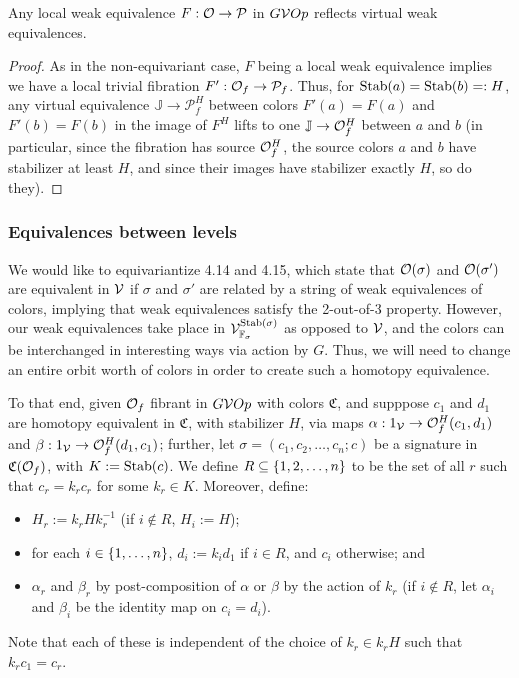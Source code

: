 \documentclass[psamsfonts,onesided,10pt,letterpaper]{amsart}%
\renewcommand{\C}{\ensuremath{\mathfrak{C}}}
\newcommand{\J}{\ensuremath{\mathbb{J}}}
\renewcommand{\P}{\ensuremath{\mathcal{P}}}
\newcommand{\Vsigma}{\ensuremath{\V^{\Stab(\sigma)}_{\F_\sigma}}}
\begin{document}
\begin{lemma}
  Any local weak equivalence $F: \O\to \P$ in $G\mathcal V Op$ reflects virtual weak equivalences.
\end{lemma}
\begin{proof}
  As in the non-equivariant case, $F$ being a local weak equivalence implies we have a local trivial fibration $F': \O_f\to \P_f$. Thus, for $\mathrm{Stab}(a) = \mathrm{Stab}(b) =: H$, any virtual equivalence $\J \to \P_f^H$ between colors $F'(a) = F(a)$ and $F'(b) = F(b)$ in the image of $F^H$ lifts to one $\J\to \O_f^H$ between $a$ and $b$ (in particular, since the fibration has source $\mathcal{O}_f^H$, the source colors $a$ and $b$ have stabilizer at least $H$, and since their images have stabilizer exactly $H$, so do they). 
\end{proof}

\subsubsection{Equivalences between levels}

We would like to equivariantize \cite{Cav14} 4.14 and 4.15, which state that $\mathcal{O}(\sigma)$ and $\mathcal{O}(\sigma')$ are equivalent in $\mathcal V$ if $\sigma$ and $\sigma'$ are related by a string of weak equivalences of colors, implying that weak equivalences satisfy the 2-out-of-3 property. However, our weak equivalences take place in $\Vsigma$ as opposed to $\mathcal V$, and the colors can be interchanged in interesting ways via action by $G$. Thus, we will need to change an entire orbit worth of colors in order to create such a homotopy equivalence. 

To that end, given $\mathcal{O}_f$ fibrant in $G\mathcal V Op$ with colors $\C$, and supppose $c_1$ and $d_1$ are homotopy equivalent in $\C$, with stabilizer $H$, via maps $\alpha: 1_{\mathcal V} \to \mathcal{O}_f^H(c_1,d_1)$ and $\beta: 1_{\mathcal V} \to \mathcal{O}_f^H(d_1,c_1)$; further, let $\sigma = (c_1,c_2,\ldots, c_n;c)$ be a signature in $\C(\O_f)$, with $K := \mathrm{Stab}(c)$. We define $R\subseteq \left\{1,2,\ldots, n\right\}$ to be the set of all $r$ such that $c_r = k_r c_r$ for some $k_r\in K$. Moreover, define:
\begin{itemize}
\item $H_r := k_rHk_r^{-1}$ (if $i\not\in R$, $H_i := H$);
\item for each $i\in \left\{1,\ldots, n\right\}$, $d_i := k_id_1$ if $i\in R$, and $c_i$ otherwise; and
\item $\alpha_r$ and $\beta_r$ by post-composition of $\alpha$ or $\beta$ by the action of $k_r$ (if $i\not\in R$, let $\alpha_i$ and $\beta_i$ be the identity map on $c_i = d_i$).  
\end{itemize}
Note that each of these is independent of the choice of $k_r\in k_r H$ such that $k_r c_1 = c_r$. 
\end{document}
